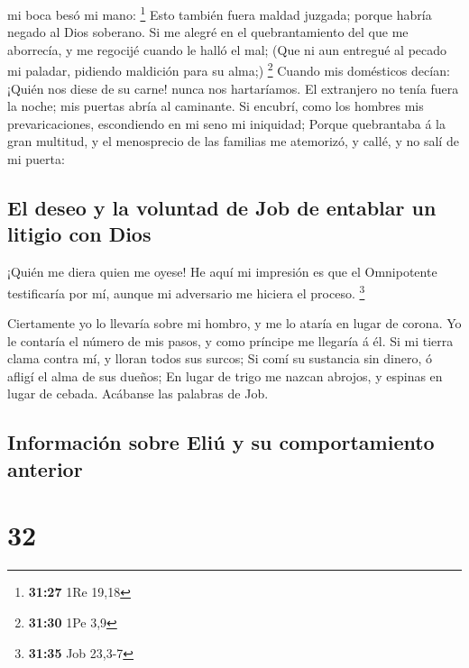 mi boca besó mi mano: \footnote{\textbf{31:27} 1Re 19,18} 
Esto también fuera maldad juzgada; porque habría negado al Dios
soberano.  Si me alegré en el quebrantamiento del que me
aborrecía, y me regocijé cuando le halló el mal;  (Que ni
aun entregué al pecado mi paladar, pidiendo maldición para su alma;)
\footnote{\textbf{31:30} 1Pe 3,9}  Cuando mis domésticos
decían: ¡Quién nos diese de su carne! nunca nos hartaríamos.
 El extranjero no tenía fuera la noche; mis puertas abría
al caminante.  Si encubrí, como los hombres mis
prevaricaciones, escondiendo en mi seno mi iniquidad; 
Porque quebrantaba á la gran multitud, y el menosprecio de las familias
me atemorizó, y callé, y no salí de mi puerta:

\hypertarget{el-deseo-y-la-voluntad-de-job-de-entablar-un-litigio-con-dios}{%
\subsection{El deseo y la voluntad de Job de entablar un litigio con
Dios}\label{el-deseo-y-la-voluntad-de-job-de-entablar-un-litigio-con-dios}}

 ¡Quién me diera quien me oyese! He aquí mi impresión es
que el Omnipotente testificaría por mí, aunque mi adversario me hiciera
el proceso. \footnote{\textbf{31:35} Job 23,3-7}

 Ciertamente yo lo llevaría sobre mi hombro, y me lo ataría
en lugar de corona.  Yo le contaría el número de mis pasos,
y como príncipe me llegaría á él.  Si mi tierra clama
contra mí, y lloran todos sus surcos;  Si comí su sustancia
sin dinero, ó afligí el alma de sus dueños;  En lugar de
trigo me nazcan abrojos, y espinas en lugar de cebada. Acábanse las
palabras de Job.

\hypertarget{informaciuxf3n-sobre-eliuxfa-y-su-comportamiento-anterior}{%
\subsection{Información sobre Eliú y su comportamiento
anterior}\label{informaciuxf3n-sobre-eliuxfa-y-su-comportamiento-anterior}}

\hypertarget{section-31}{%
\section{32}\label{section-31}}

